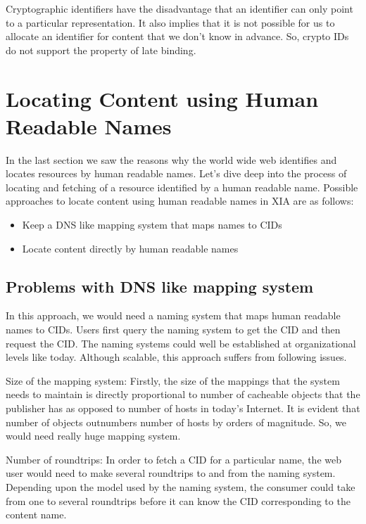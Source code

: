 Cryptographic identifiers have the disadvantage that an identifier can
only point to a particular representation. It also implies that it is
not possible for us to allocate an identifier for content that we
don’t know in advance. So, crypto IDs do not support the property of
late binding.

\section{Locating Content using Human Readable Names}

In the last section we saw the reasons why the world wide web
identifies and locates resources by human readable names. Let’s dive
deep into the process of locating and fetching of a resource
identified by a human readable name.
Possible approaches to locate content using human readable names in
XIA are as follows:
\begin{itemize}
\item Keep a DNS like mapping system that maps names to CIDs
\item Locate content directly by human readable names
\end{itemize}

\subsection{Problems with DNS like mapping system}

In this approach, we would need a naming system that maps human
readable names to CIDs. Users first query the naming system to get the
CID and then request the CID. The naming systems could well be
established at organizational levels like today. Although scalable,
this approach suffers from following issues.

Size of the mapping system: Firstly, the size of the mappings that the
system needs to maintain is directly proportional to number of
cacheable objects that the publisher has as opposed to number of hosts
in today’s Internet. It is evident that number of objects outnumbers
number of hosts by orders of magnitude. So, we would need really huge
mapping system.

Number of roundtrips: In order to fetch a CID for a particular name,
the web user would need to make several roundtrips to and from the
naming system. Depending upon the model used by the naming system, the
consumer could take from one to several roundtrips before it can know
the CID corresponding to the content name.

